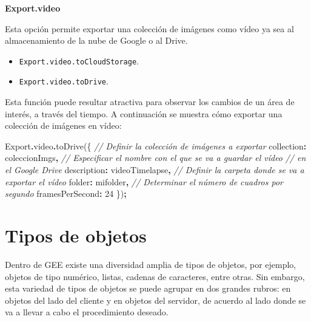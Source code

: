 \documentclass[
  12pt,
  letterpaper,
  twoside]{book}
\newenvironment{Shaded}{\begin{snugshade}}{\end{snugshade}}
\newcommand{\AttributeTok}[1]{\textcolor[rgb]{0.77,0.63,0.00}{#1}}
\newcommand{\CommentTok}[1]{\textcolor[rgb]{0.56,0.35,0.01}{\textit{#1}}}
\newcommand{\DataTypeTok}[1]{\textcolor[rgb]{0.13,0.29,0.53}{#1}}
\newcommand{\DecValTok}[1]{\textcolor[rgb]{0.00,0.00,0.81}{#1}}
\newcommand{\FunctionTok}[1]{\textcolor[rgb]{0.00,0.00,0.00}{#1}}
\newcommand{\NormalTok}[1]{#1}
\newcommand{\OperatorTok}[1]{\textcolor[rgb]{0.81,0.36,0.00}{\textbf{#1}}}
\newcommand{\StringTok}[1]{\textcolor[rgb]{0.31,0.60,0.02}{#1}}
\providecommand{\tightlist}{%
  \setlength{\itemsep}{0pt}\setlength{\parskip}{0pt}}
\begin{document}
\textbf{Export.video}

Esta opción permite exportar una colección de imágenes como vídeo ya sea al almacenamiento de la nube de Google o al Drive.

\begin{itemize}
\tightlist
\item
  \texttt{Export.video.toCloudStorage}.
\item
  \texttt{Export.video.toDrive}.
\end{itemize}

Esta función puede resultar atractiva para observar los cambios de un área de interés, a través del tiempo. A continuación se muestra cómo exportar una colección de imágenes en vídeo:

\begin{Shaded}
\begin{Highlighting}[]
\NormalTok{Export}\OperatorTok{.}\AttributeTok{video}\OperatorTok{.}\FunctionTok{toDrive}\NormalTok{(\{}
  \CommentTok{// Definir la colección de imágenes a exportar}
  \DataTypeTok{collection}\OperatorTok{:}\NormalTok{ coleccionImgs}\OperatorTok{,}
  \CommentTok{// Especificar el nombre con el que se va a guardar el vídeo}
  \CommentTok{// en el Google Drive}
  \DataTypeTok{description}\OperatorTok{:} \StringTok{\textquotesingle{}videoTimelapse\textquotesingle{}}\OperatorTok{,}
  \CommentTok{// Definir la carpeta donde se va a exportar el vídeo}
  \DataTypeTok{folder}\OperatorTok{:} \StringTok{\textquotesingle{}mifolder\textquotesingle{}}\OperatorTok{,}
  \CommentTok{// Determinar el número de cuadros por segundo}
  \DataTypeTok{framesPerSecond}\OperatorTok{:} \DecValTok{24}
\NormalTok{ \})}\OperatorTok{;}
\end{Highlighting}
\end{Shaded}

\newpage

\hypertarget{tipos-de-objetos}{%
\chapter{Tipos de objetos}\label{tipos-de-objetos}}

Dentro de GEE existe una diversidad amplia de tipos de objetos, por ejemplo, objetos de tipo numérico, listas, cadenas de caracteres, entre otras. Sin embargo, esta variedad de tipos de objetos se puede agrupar en dos grandes rubros: en objetos del lado del cliente y en objetos del servidor, de acuerdo al lado donde se va a llevar a cabo el procedimiento deseado.
\end{document}
